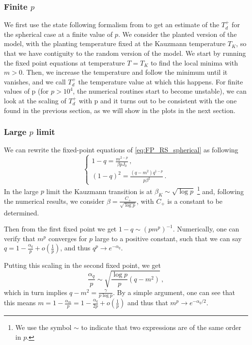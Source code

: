 \documentclass[]{article}
\theoremstyle{plain}%
\theoremstyle{definition}%
\theoremstyle{remark}%
\begin{document}
\subsubsection{Finite $p$}
We first use the state following formalism from \citep{krzakala_2010,sun_2012} to get an estimate of the $T_d^+$ for the spherical case at a finite value of $p$.
We consider the planted version of the model, with the planting temperature fixed at the Kauzmann temperature $T_K$, so that we have contiguity to the random version of the model.
We start by running the fixed point equations at temperature $T = T_K$ to find the local minima with $m > 0$.
Then, we increase the temperature and follow the minimum until it vanishes, and we call $T_d^+$ the temperature value at which this happens.
For finite values of p (for $p > 10^4$, the numerical routines start to become unstable), we can look at the scaling of $T_d^+$ with p and it turns out to be consistent with the one found in the previous section, as we will show in the plots in the next section.

\subsubsection{Large $p$ limit}
We can rewrite the fixed-point equations of \eqref{eq:FP_RS_spherical} as following
\begin{equation}\label{eq:fixedpoints}
\begin{cases}
    1-q = \frac{m^{2-p}}{\beta p J_0}\,, \\
    (1-q)^2 = \frac{(q-m^2)q^{1-p}}{p\beta^2}\,.
\end{cases}
\end{equation}
In the large $p$ limit the Kauzmann transition is at $\beta_K \sim \sqrt{\log p}$ \footnote{We use the symbol $\sim$ to indicate that two expressions are of the same order in $p$.}\cite{kurchan1993barriers} and, following the numerical results, we consider $\beta = \frac{C_+}{\sqrt{\log p}}$, with $C_+$ is a constant to be determined.

Then from the first fixed point we get $1-q \sim (pm^p)^{-1}$. Numerically, one can verify that $m^p$ converges for $p$ large to a positive constant, such that we can say $q = 1 - \frac{\alpha_q}{p} + o(\frac{1}{p})$, and thus $q^p\to e^{-\alpha_q}$.

Putting this scaling in the second fixed point, we get
\begin{equation}
    \frac{\alpha_q}{p} \sim \sqrt{\frac{\log p}{p}(q-m^2)}\,,
\end{equation}
which in turn implies $q-m^2 = \frac{\gamma}{p\log p}$. By a simple argument, one can see that this means $m = 1 - \frac{\alpha_m}{p}= 1 - \frac{\alpha_q}{2p} + o(\frac{1}{p})$ and thus that $m^p\to e^{-\alpha_q/2}$.
\end{document}
